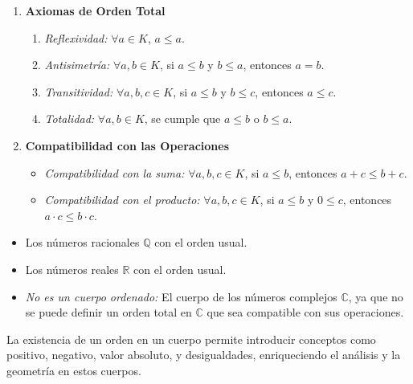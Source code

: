 \begin{enumerate}
	\item \textbf{Axiomas de Orden Total}
	
	\begin{enumerate}[label=\roman*)]
		\item \textit{Reflexividad:} $\forall a \in K$, $a \leq a$.
		\item \textit{Antisimetría:} $\forall a, b \in K$, si $a \leq b$ y $b \leq a$, entonces $a = b$.
		\item \textit{Transitividad:} $\forall a, b, c \in K$, si $a \leq b$ y $b \leq c$, entonces $a \leq c$.
		\item \textit{Totalidad:} $\forall a, b \in K$, se cumple que $a \leq b$ o $b \leq a$.
	\end{enumerate}
	
	\item \textbf{Compatibilidad con las Operaciones}
	
	\begin{itemize}
		\item \textit{Compatibilidad con la suma:} $\forall a, b, c \in K$, si $a \leq b$, entonces $a + c \leq b + c$.
		\item \textit{Compatibilidad con el producto:} $\forall a, b, c \in K$, si $a \leq b$ y $0 \leq c$, entonces $a \cdot c \leq b \cdot c$.
	\end{itemize}
\end{enumerate}

\begin{fmd-example}
\begin{itemize}
	\item Los números racionales $\mathbb{Q}$ con el orden usual.
	\item Los números reales $\mathbb{R}$ con el orden usual.
	\item \textit{No es un cuerpo ordenado:} El cuerpo de los números complejos $\mathbb{C}$, ya que no se puede definir un orden total en $\mathbb{C}$ que sea compatible con sus operaciones.
\end{itemize}
\end{fmd-example}

\begin{lgremark}
	La existencia de un orden en un cuerpo permite introducir conceptos como positivo, negativo, valor absoluto, y desigualdades, enriqueciendo el análisis y la geometría en estos cuerpos.
\end{lgremark}

